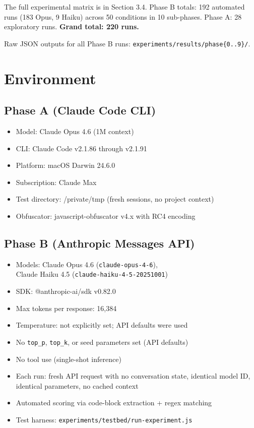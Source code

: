 \documentclass[11pt]{article}
\begin{document}
The full experimental matrix is in Section 3.4. Phase B totals: 192
automated runs (183 Opus, 9 Haiku) across 50 conditions in 10 sub-phases.
Phase A: 28 exploratory runs. \textbf{Grand total: 220 runs.}

Raw JSON outputs for all Phase B runs: \texttt{experiments/results/phase\{0..9\}/}.

\section{Environment}

\subsection*{Phase A (Claude Code CLI)}
\begin{itemize}
  \item Model: Claude Opus 4.6 (1M context)
  \item CLI: Claude Code v2.1.86 through v2.1.91
  \item Platform: macOS Darwin 24.6.0
  \item Subscription: Claude Max
  \item Test directory: /private/tmp (fresh sessions, no project context)
  \item Obfuscator: javascript-obfuscator v4.x with RC4 encoding
\end{itemize}

\subsection*{Phase B (Anthropic Messages API)}
\begin{itemize}
  \item Models: Claude Opus 4.6 (\texttt{claude-opus-4-6}),\\
        Claude Haiku 4.5 (\texttt{claude-haiku-4-5-20251001})
  \item SDK: @anthropic-ai/sdk v0.82.0
  \item Max tokens per response: 16,384
  \item Temperature: not explicitly set; API defaults were used
  \item No \texttt{top\_p}, \texttt{top\_k}, or seed parameters set (API defaults)
  \item No tool use (single-shot inference)
  \item Each run: fresh API request with no conversation state, identical
    model ID, identical parameters, no cached context
  \item Automated scoring via code-block extraction + regex matching
  \item Test harness: \texttt{experiments/testbed/run-experiment.js}
\end{itemize}
\end{document}
